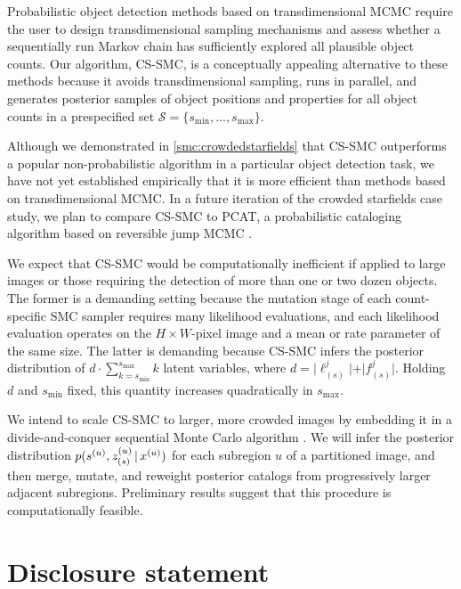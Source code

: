 \documentclass[
  12pt]{article}
\newcommand{\padvert}{\thinspace \vert \thinspace}
\begin{document}
Probabilistic object detection methods based on transdimensional MCMC require the user to design transdimensional sampling mechanisms and assess whether a sequentially run Markov chain has sufficiently explored all plausible object counts. Our algorithm, CS-SMC, is a conceptually appealing alternative to these methods because it avoids transdimensional sampling, runs in parallel, and generates posterior samples of object positions and properties for all object counts in a prespecified set $\mathcal{S} = \{s_{\min},...,s_{\max}\}$.

Although we demonstrated in \autoref{smc:crowdedstarfields} that CS-SMC outperforms a popular non-probabilistic algorithm in a particular object detection task, we have not yet established empirically that it is more efficient than methods based on transdimensional MCMC. In a future iteration of the crowded starfields case study, we plan to compare CS-SMC to PCAT, a probabilistic cataloging algorithm based on reversible jump MCMC \citep{portillo2017improved,feder2020multiband}.

We expect that CS-SMC would be computationally inefficient if applied to large images or those requiring the detection of more than one or two dozen objects. The former is a demanding setting because the mutation stage of each count-specific SMC sampler requires many likelihood evaluations, and each likelihood evaluation operates on the $H{\times}W$-pixel image and a mean or rate parameter of the same size. The latter is demanding because CS-SMC infers the posterior distribution of $d \cdot \sum_{k=s_{\min}}^{s_{\max}} k$ latent variables, where $d = \vert \ell_{(s)}^j \vert + \vert f_{(s)}^j \vert$. Holding $d$ and $s_{\min}$ fixed, this quantity increases quadratically in $s_{\max}$.

We intend to scale CS-SMC to larger, more crowded images by embedding it in a divide-and-conquer sequential Monte Carlo algorithm \citep{lindsten2017divide,kuntz2024divide}. We will infer the posterior distribution $p(s^{(u)}, z_{(s)}^{(u)} \padvert x^{(u)})$ for each subregion $u$ of a partitioned image, and then merge, mutate, and reweight posterior catalogs from progressively larger adjacent subregions. Preliminary results suggest that this procedure is computationally feasible.



\section{Disclosure statement}\label{disclosure-statement}
\end{document}
